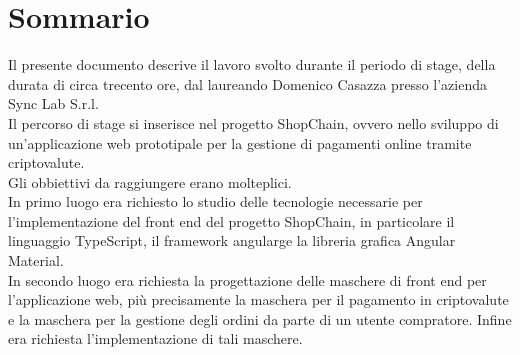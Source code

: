 \cleardoublepage
{}
{}
\begingroup
\let\clearpage\relax
\let\cleardoublepage\relax
\let\cleardoublepage\relax

\chapter*{Sommario}

Il presente documento descrive il lavoro svolto durante il periodo di stage, della durata di circa trecento ore, dal laureando Domenico Casazza presso l'azienda Sync Lab S.r.l.\\
Il percorso di stage si inserisce nel progetto ShopChain, ovvero nello sviluppo di un'applicazione web prototipale per la gestione di pagamenti online tramite criptovalute.\\
Gli obbiettivi da raggiungere erano molteplici.\\
In primo luogo era richiesto lo studio delle tecnologie necessarie per l'implementazione del front end del progetto ShopChain, in particolare il linguaggio TypeScript, il framework \gls{angularg}\glsfirstoccur e la libreria grafica Angular Material.\\
In secondo luogo era richiesta la progettazione delle maschere di front end per l'applicazione web, più precisamente la maschera per il pagamento in criptovalute e la maschera per la gestione degli ordini da parte di un utente compratore.
Infine era richiesta l'implementazione di tali maschere.

%
%
\endgroup
\vfill